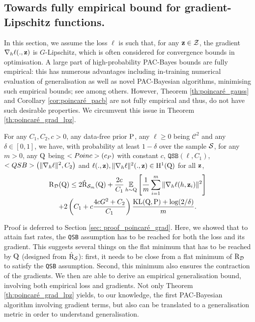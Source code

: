 \subsection{Towards fully empirical bound for gradient-Lipschitz functions.}
In this section,  we assume the loss $\ell$ is such that, for any $\z\in\Zcal$, the gradient $\nabla_h\ell(.,\z)$ is $G$-Lipschitz, which is often considered for convergence bounds in optimisation.
A large part of high-probability PAC-Bayes bounds are fully empirical: this has numerous advantages including in-training numerical evaluation of generalisation as well as novel PAC-Bayesian algorithms, minimising such empirical bounds; see \citep{dziugaite2017computing,perez2021progress,viallard2023learning} among others.
However, Theorem \ref{th:poincaré_gauss} and Corollary \ref{cor:poincaré_pacb} are not fully empirical and thus, do not have such desirable properties. We circumvent this issue in Theorem \ref{th:poincaré_grad_lpz}.
\begin{theorem}
  \label{th:poincaré_grad_lpz}
    For any $C_1,C_2,c>0$, any data-free prior $\P$, any $\ell\geq 0$ being $\mathcal{C}^2$ and any $\delta\in [0,1]$, we have, with probability at least $1-\delta$ over the sample $\S$, for any $m>0$, any $\Q$ being $\Poinc(c_P)$ with constant $c$, $\texttt{QSB}(\ell,C_1)$, $\texttt{QSB}\LP\|\nabla_h \ell\|^2,C_2\RP$ and $\ell(.,\z),\|\nabla_h \ell\|^2(.,\z)\in \mathrm{H}^{1}(\Q)$ for all $\z$, 
    \begin{multline*}
      \Risk_{\D}(\Q) \leq  2 \hat{\Risk}_{\S_m}(\Q) + \frac{2c}{C_1} \EE_{h\sim \Q}\LB \frac{1}{m}\sum_{i=1}^m \|\nabla_h\ell(h,\z_i)\|^2 \RB \\
       + 2\LP C_1 + c\frac{4cG^2 + C_2}{C_1} \RP\frac{\KL(\Q,\P) +\log(2/\delta)}{m}.
    \end{multline*}
\end{theorem}
Proof is deferred to Section \ref{sec: proof_poincaré_grad}.
Here, we showed that to attain fast rates, the \texttt{QSB} assumption has to be reached for both the loss and its gradient.
This suggests several things on the flat minimum that has to be reached by $\Q$ (designed from $\hat{\Risk}_\S$): first, it needs to be close from a flat minimum of $\Risk_\D$ to satisfy the \texttt{QSB} assumption.
Second, this minimum also ensures the contraction of the gradients.
We then are able to derive an empirical generalisation bound, involving both empirical loss and gradients.
Not only Theorem \ref{th:poincaré_grad_lpz} yields, to our knowledge, the first PAC-Bayesian algorithm involving gradient terms, but also can be translated to a generalisation metric in order to understand generalisation.
